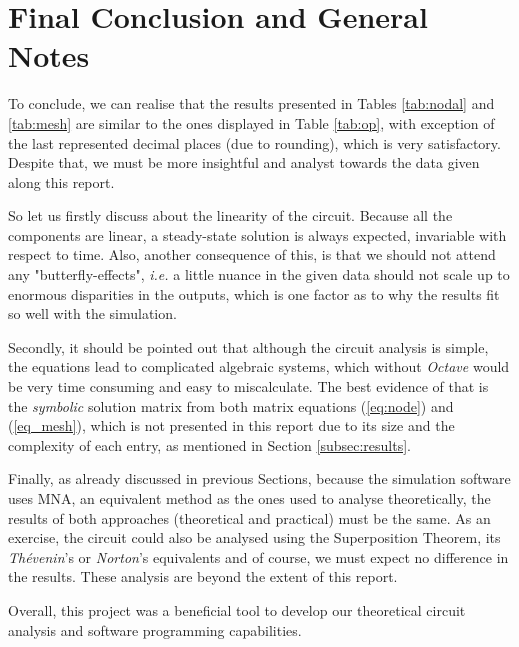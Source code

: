 \section{Final Conclusion and General Notes}
\label{sec:conclusion}

To conclude, we can realise that the results presented in Tables \ref{tab:nodal} and \ref{tab:mesh} are similar to the ones displayed in Table \ref{tab:op}, with exception of the last represented decimal places (due to rounding), which is very satisfactory. Despite that, we must be more insightful and analyst towards the data given along this report. \par
So let us firstly discuss about the linearity of the circuit. Because all the components are linear, a steady-state solution is always expected, invariable with respect to time. Also, another consequence of this, is that we should not attend any "butterfly-effects", \textit{i.e.} a little nuance in the given data should not scale up to enormous disparities in the outputs, which is one factor as to why the results fit so well with the simulation. \par
Secondly, it should be pointed out that although the circuit analysis is simple, the equations lead to complicated algebraic systems, which without \textit{Octave} would be very time consuming and easy to miscalculate. The best evidence of that is the \emph{symbolic} solution matrix from both matrix equations (\ref{eq:node}) and (\ref{eq_mesh}), which is not presented in this report due to its size and the complexity of each entry, as mentioned in Section \ref{subsec:results}. \par
Finally, as already discussed in previous Sections, because the simulation software uses MNA, an equivalent method as the ones used to analyse theoretically, the results of both approaches (theoretical and practical) must be the same. As an exercise, the circuit could also be analysed using the Superposition Theorem, its \textit{Thévenin}'s or \textit{Norton}'s equivalents and of course, we must expect no difference in the results. These analysis are beyond the extent of this report. 

Overall, this project was a beneficial tool to develop our theoretical circuit analysis and software programming capabilities. 
